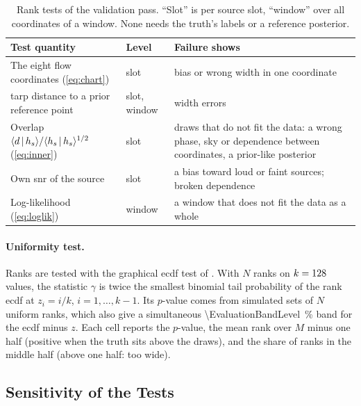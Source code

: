 \begin{table}[t]
  \centering
  \caption{Rank tests of the validation pass. ``Slot'' is per source slot, ``window'' over all
   coordinates of a window. None needs the truth's labels or a reference posterior.}
  \label{tab:evaluation-tests}
  \small
  \begin{tabular}{@{}>{\raggedright\arraybackslash}p{}l>{\raggedright\arraybackslash}p{}@{}}
    \toprule
    Test quantity & Level & Failure shows \\
    \midrule
    The eight flow coordinates (\cref{eq:chart}) & slot & bias or wrong width in one coordinate \\
    \acs{tarp} distance to a prior reference point \citep{lemos2023sampling} & slot, window & width errors \\
    Overlap $\langle d \,|\, h_s \rangle/\langle h_s \,|\, h_s \rangle^{1/2}$ (\cref{eq:inner}) & slot & draws that do not fit the data: a wrong phase, sky or dependence between coordinates, a prior-like posterior \\
    Own \acs{snr} of the source & slot & a bias toward loud or faint sources; broken dependence \\
    Log-likelihood (\cref{eq:loglik}) & window & a window that does not fit the data as a whole \\
    \bottomrule
  \end{tabular}
\end{table}

\paragraph{Uniformity test.}
Ranks are tested with the graphical \ac{ecdf} test of \citet{sailynoja2022graphical}. With $N$ ranks on
$k = 128$ values, the statistic $\gamma$ is twice the smallest binomial tail probability of the rank
\ac{ecdf} at $z_i = i/k$, $i = 1,\dots,k-1$. Its $p$-value comes from \EvaluationGammaSims{} simulated sets of $N$
uniform ranks, which also give a simultaneous \qty{\EvaluationBandLevel}{\percent} band for the \ac{ecdf} minus $z$.
Each cell reports the $p$-value, the mean rank over $M$ minus one half (positive when the truth sits above the draws),
and the share of ranks in the middle half (above one half: too wide).

\subsection{Sensitivity of the Tests}
\label{app:evaluation-sensitivity}

